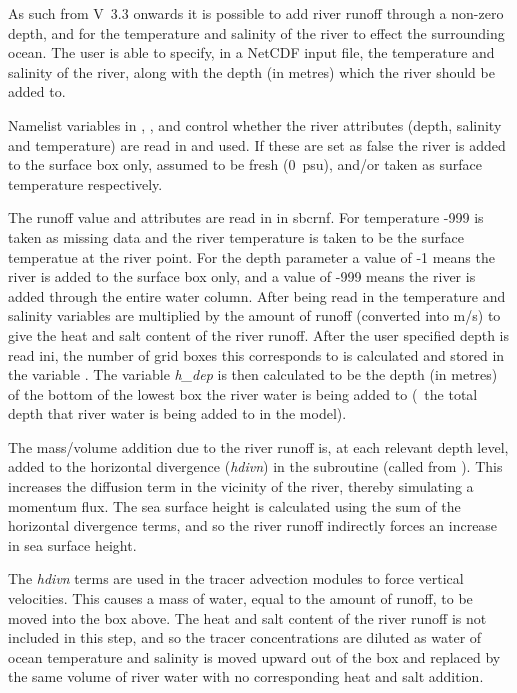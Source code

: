\documentclass[../main/NEMO_manual]{subfiles}
\begin{document}
As such from V~3.3 onwards it is possible to add river runoff through a non-zero depth,
and for the temperature and salinity of the river to effect the surrounding ocean.
The user is able to specify, in a NetCDF input file, the temperature and salinity of the river,
along with the depth (in metres) which the river should be added to.

Namelist variables in , ,  and
 control whether the river attributes (depth, salinity and temperature) are read in and used.
If these are set as false the river is added to the surface box only, assumed to be fresh (0~psu),
and/or taken as surface temperature respectively.

The runoff value and attributes are read in in sbcrnf.
For temperature -999 is taken as missing data and the river temperature is taken to
be the surface temperatue at the river point.
For the depth parameter a value of -1 means the river is added to the surface box only,
and a value of -999 means the river is added through the entire water column.
After being read in the temperature and salinity variables are multiplied by the amount of runoff
(converted into m/s) to give the heat and salt content of the river runoff.
After the user specified depth is read ini,
the number of grid boxes this corresponds to is calculated and stored in the variable .
The variable \textit{h\_dep} is then calculated to be the depth (in metres) of
the bottom of the lowest box the river water is being added to
(\ie\ the total depth that river water is being added to in the model).

The mass/volume addition due to the river runoff is, at each relevant depth level, added to
the horizontal divergence (\textit{hdivn}) in the subroutine  (called from ).
This increases the diffusion term in the vicinity of the river, thereby simulating a momentum flux.
The sea surface height is calculated using the sum of the horizontal divergence terms,
and so the river runoff indirectly forces an increase in sea surface height.

The \textit{hdivn} terms are used in the tracer advection modules to force vertical velocities.
This causes a mass of water, equal to the amount of runoff, to be moved into the box above.
The heat and salt content of the river runoff is not included in this step,
and so the tracer concentrations are diluted as water of ocean temperature and salinity is moved upward out of
the box and replaced by the same volume of river water with no corresponding heat and salt addition.
\end{document}
